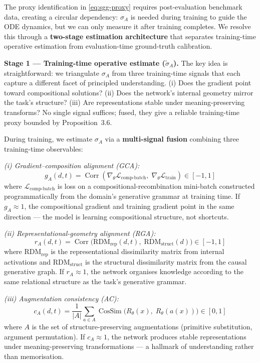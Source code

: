 \documentclass[10pt]{article}
\DeclareMathOperator{\Corr}{Corr}
\DeclareMathOperator{\CosSim}{CosSim}
\begin{document}
The proxy identification in \eqref{eq:sgg-proxy} requires
post-evaluation benchmark data, creating a circular dependency: $\sigma_A$ %
is needed during training to guide the ODE dynamics, but we can only measure it after training completes. We resolve this through a \textbf{two-stage
estimation architecture} that separates training-time operative estimation
from evaluation-time ground-truth calibration.

\textbf{Stage 1 --- Training-time operative estimate ($\tilde{\sigma}_A$).}
The key idea is straightforward: we triangulate $\sigma_A$ from three
training-time signals that each capture a different facet of principled
understanding. (i) Does the gradient point toward compositional solutions?
(ii) Does the network's internal geometry mirror the task's structure?
(iii) Are representations stable under meaning-preserving transforms?
No single signal suffices; fused, they give a reliable training-time proxy
bounded by Proposition~3.6.

During training, we estimate $\sigma_A$ via a \textbf{multi-signal fusion}
combining three training-time observables:

\textit{(i) Gradient--composition alignment (GCA):}
\begin{equation}\label{eq:gca}
g_A(d,t) = \Corr\!\left(\nabla_{\theta}\mathcal{L}_{\text{comp-batch}},\;\nabla_{\theta}\mathcal{L}_{\text{train}}\right) \in [-1,1]
\end{equation}
where $\mathcal{L}_{\text{comp-batch}}$ is loss on a compositional-recombination
mini-batch constructed programmatically from the domain's generative grammar
at training time.
If $g_A \approx 1$, the compositional gradient and training gradient point
in the same direction --- the model is learning compositional structure,
not shortcuts.

\textit{(ii) Representational-geometry alignment (RGA):}
\begin{equation}\label{eq:rga}
r_A(d,t) = \Corr\!\Big(\text{RDM}_{\text{rep}}(d,t),\;\text{RDM}_{\text{struct}}(d)\Big) \in [-1,1]
\end{equation}
where $\text{RDM}_{\text{rep}}$ is the representational dissimilarity matrix
from internal activations and $\text{RDM}_{\text{struct}}$ is the structural
dissimilarity matrix from the causal generative graph.
If $r_A \approx 1$, the network organises knowledge according to the
same relational structure as the task's generative grammar.

\textit{(iii) Augmentation consistency (AC):}
\begin{equation}\label{eq:ac}
c_A(d,t) = \frac{1}{|A|}\sum_{a \in A} \CosSim\!\Big(R_{\theta}(x),\;R_{\theta}(a(x))\Big) \in [0,1]
\end{equation}
where $A$ is the set of structure-preserving augmentations (primitive
substitution, argument permutation).
If $c_A \approx 1$, the network produces stable representations under
meaning-preserving transformations --- a hallmark of understanding
rather than memorisation.
\end{document}

